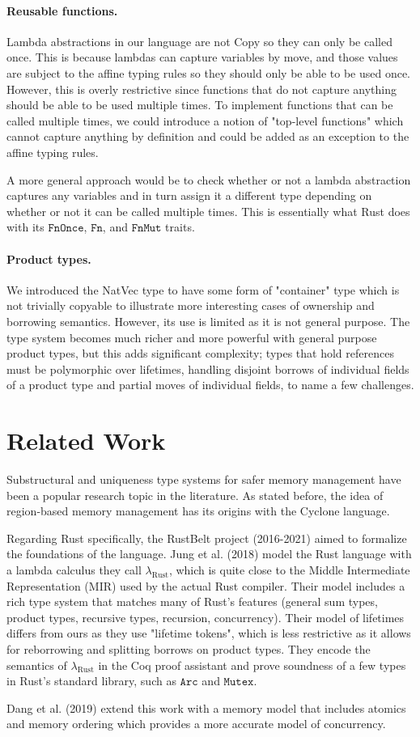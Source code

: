 \documentclass[letterpaper,11pt]{article}
\begin{document}
\paragraph{Reusable functions.} Lambda abstractions in our language are not Copy so they can only be called once. This is because lambdas 
can capture variables by move, and those values are subject to the affine typing rules so they should only be able to be used once.
However, this is overly restrictive since functions that do not capture anything should be able to be used multiple times. To implement functions that can be called multiple times,
we could introduce a notion of "top-level functions" which cannot capture anything by definition and could be added as an exception to the affine typing rules.

A more general approach would be to check whether or not a lambda abstraction captures any variables and in turn assign it a different type
depending on whether or not it can be called multiple times. This is essentially what Rust does with its $\mathtt{FnOnce}$,
$\mathtt{Fn}$, and $\mathtt{FnMut}$ traits.

\paragraph{Product types.} We introduced the NatVec type to have some form of "container" type which is not
trivially copyable to illustrate more interesting cases of ownership and borrowing semantics. However, its use is limited as it
is not general purpose. The type system becomes much richer and more powerful with general purpose product types, but this adds
significant complexity; types that hold references must be polymorphic over lifetimes, handling disjoint borrows of individual fields of a product type and 
partial moves of individual fields, to name a few challenges.


\section{Related Work}

Substructural and uniqueness type systems for safer memory management have been
a popular research topic in the literature. As stated before, the idea of region-based
memory management has its origins with the Cyclone language.

Regarding Rust specifically, the RustBelt project (2016-2021) aimed to
formalize the foundations of the language. Jung et al. (2018) \cite{rustbelt1} model the Rust language
with a lambda calculus they call $\lambda_{\text{Rust}}$, which is quite close to the Middle Intermediate Representation (MIR)
used by the actual Rust compiler. Their model includes a rich type system that matches many of Rust's features
(general sum types, product types, recursive types, recursion, concurrency). Their model of lifetimes differs from ours as
they use "lifetime tokens", which is less restrictive as it allows for reborrowing and splitting borrows on product types.
They encode the semantics of $\lambda_{\text{Rust}}$ in the Coq proof assistant and prove soundness of a few types in Rust's standard library,
such as $\mathtt{Arc}$ and $\mathtt{Mutex}$. 

Dang et al. (2019) \cite{rustbelt2} extend this work with a memory model that includes atomics and memory ordering which provides a more accurate model
of concurrency.




\end{document}
